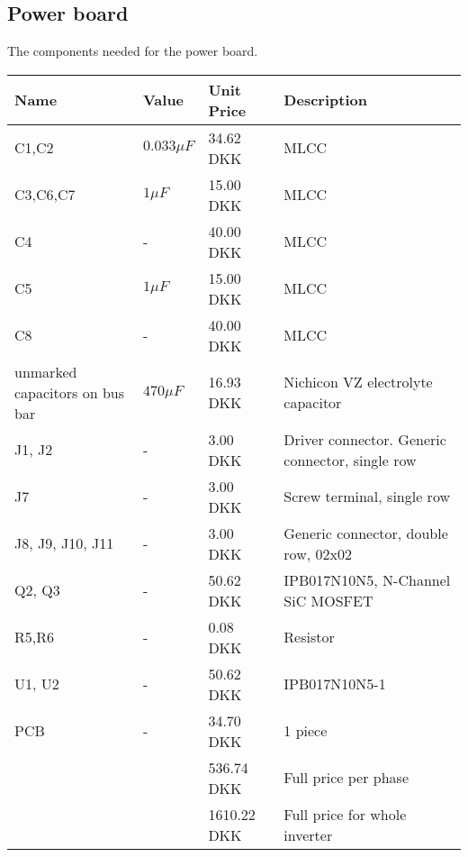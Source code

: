 \subsection{Power board}
The components needed for the power board.
\begin{table}[H]
\centering
\footnotesize
\begin{tabular}{|p{4cm} p{1.5cm} p{2.2cm} p{6cm}|} \hline
\textbf{Name}    & \textbf{Value} & \textbf{Unit Price}
& \textbf{Description}                            \\ \hline
C1,C2            & $0.033\mu F$   & 34.62 DKK & MLCC                                            \\
C3,C6,C7         & $1\mu F$       & 15.00 DKK & MLCC                                            \\
C4               & -              & 40.00 DKK & MLCC                                            \\
C5               & $1\mu F$       & 15.00 DKK & MLCC                                            \\
C8               & -              & 40.00 DKK & MLCC                                            \\
unmarked capacitors on bus bar     & $470 \mu F$ & 16.93 DKK & Nichicon VZ electrolyte capacitor        \\
J1, J2           &  -             & 3.00 DKK & Driver connector. Generic connector, single row \\
J7               & -              & 3.00 DKK  & Screw terminal, single row                      \\
J8, J9, J10, J11 & -              & 3.00 DKK & Generic connector, double row, 02x02            \\
Q2, Q3           & -              & 50.62 DKK & IPB017N10N5, N-Channel SiC MOSFET               \\
R5,R6            & -              & 0.08 DKK & Resistor                                        \\
U1, U2           & -              & 50.62 DKK & IPB017N10N5-1 \\ 
PCB                & -                  & 34.70 DKK  & 1 piece    \\\hline
&& 536.74 DKK & Full price per phase \\ \hline
&& 1610.22 DKK & Full price for whole inverter \\ \hline
\end{tabular}
\end{table}

